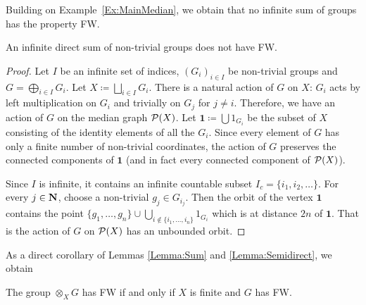 Building on Example~\ref{Ex:MainMedian}, we obtain that no infinite sum of groups has the property FW.
\begin{lem}\label{Lemma:Sum}
An infinite direct sum of non-trivial groups does not have FW.
\end{lem}
\begin{proof}
Let $I$ be an infinite set of indices, $(G_i)_{i\in I}$ be non-trivial groups and $G=\bigoplus_{i\in I} G_i$.
Let $X\coloneqq\bigsqcup_{i\in I} G_i$.
There is a natural action of $G$ on $X$: $G_i$ acts by left multiplication on $G_i$ and trivially on $G_j$ for $j\neq i$.
Therefore, we have an action of $G$ on the median graph $\mathcal P(X)$.
Let $\mathbf 1\coloneqq\bigcup 1_{G_i}$ be the subset of $X$ consisting of the identity elements of all the $G_i$.
Since every element of $G$ has only a finite number of non-trivial coordinates, the action of $G$ preserves the connected components of $\mathbf 1$ (and in fact every connected component of $\mathcal P(X)$).

Since $I$ is infinite, it contains an infinite countable subset $I_c=\{i_1,i_2,\dots\}$.
For every $j\in \mathbf{N}$, choose a non-trivial $g_j\in G_{i_j}$.
Then the orbit of the vertex $\mathbf 1$ contains the point $\{g_1,\dots, g_n\}\cup\bigcup_{i\notin\{i_1,\dots,i_n\}} 1_{G_{i}}$ which is at distance $2n$ of $\mathbf 1$.
That is the action of $G$ on $\mathcal P(X)$ has an unbounded orbit.
\end{proof}

As a direct corollary of Lemmas \ref{Lemma:Sum} and \ref{Lemma:Semidirect}, we obtain
\begin{cor}\label{Cor:Sum}
The group $\otimes_X G$ has FW if and only if $X$ is finite and $G$ has FW.
\end{cor}


